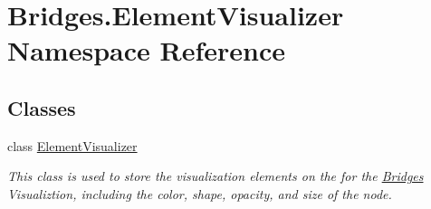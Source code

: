 \hypertarget{namespace_bridges_1_1_element_visualizer}{}\section{Bridges.\+Element\+Visualizer Namespace Reference}
\label{namespace_bridges_1_1_element_visualizer}
\subsection*{Classes}
\begin{DoxyCompactItemize}
\item 
class \mbox{\hyperlink{class_bridges_1_1_element_visualizer_1_1_element_visualizer}{Element\+Visualizer}}
\begin{DoxyCompactList}\small\item\em This class is used to store the visualization elements on the for the \mbox{\hyperlink{namespace_bridges_1_1_bridges}{Bridges}} Visualiztion, including the color, shape, opacity, and size of the node. \end{DoxyCompactList}\end{DoxyCompactItemize}
